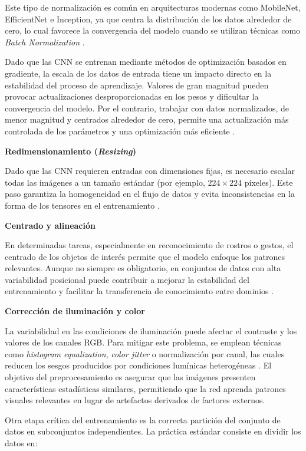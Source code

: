 	Este tipo de normalización es común en arquitecturas modernas como MobileNet, EfficientNet e Inception, ya que centra la distribución de los datos alrededor de cero, lo cual favorece la convergencia del modelo cuando se utilizan técnicas como \textit{Batch Normalization} \cite{goodfellow2016dl}.
	
	Dado que las CNN se entrenan mediante métodos de optimización basados en gradiente, la escala de los datos de entrada tiene un impacto directo en la estabilidad del proceso de aprendizaje. Valores de gran magnitud pueden provocar actualizaciones desproporcionadas en los pesos y dificultar la convergencia del modelo. Por el contrario, trabajar con datos normalizados, de menor magnitud y centrados alrededor de cero, permite una actualización más controlada de los parámetros y una optimización más eficiente \cite{goodfellow2016dl}.
	
	\textbf{Redimensionamiento (\textit{Resizing})}
	
	Dado que las CNN requieren entradas con dimensiones fijas, es necesario escalar todas las imágenes a un tamaño estándar (por ejemplo, $224 \times 224$ píxeles). Este paso garantiza la homogeneidad en el flujo de datos y evita inconsistencias en la forma de los tensores en el entrenamiento \cite{kingma2015adam}.
	
	\textbf{Centrado y alineación}
	
	En determinadas tareas, especialmente en reconocimiento de rostros o gestos, el centrado de los objetos de interés permite que el modelo enfoque los patrones relevantes. Aunque no siempre es obligatorio, en conjuntos de datos con alta variabilidad posicional puede contribuir a mejorar la estabilidad del entrenamiento y facilitar la transferencia de conocimiento entre dominios \cite{pan2010}.
	
	\textbf{Corrección de iluminación y color}
	
	La variabilidad en las condiciones de iluminación puede afectar el contraste y los valores de los canales RGB. Para mitigar este problema, se emplean técnicas como \textit{histogram equalization}, \textit{color jitter} o normalización por canal, las cuales reducen los sesgos producidos por condiciones lumínicas heterogéneas \cite{goodfellow2016dl}. El objetivo del preprocesamiento es asegurar que las imágenes presenten características estadísticas similares, permitiendo que la red aprenda patrones visuales relevantes en lugar de artefactos derivados de factores externos.
	
	Otra etapa crítica del entrenamiento es la correcta partición del conjunto de datos en subconjuntos independientes. La práctica estándar consiste en dividir los datos en:
	
